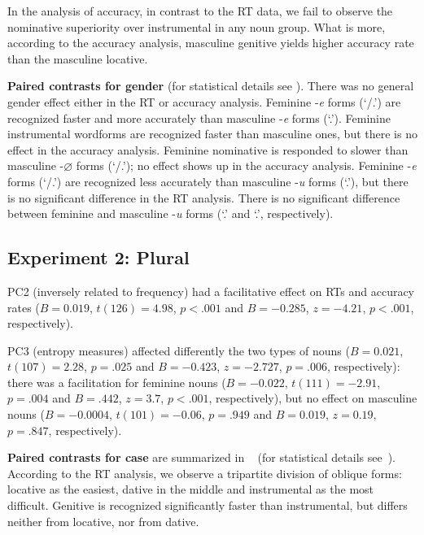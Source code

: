 \documentclass[output=paper, modfonts,newtxmath,hidelinks]{langscibook}
\begin{document}
In the analysis of accuracy, in contrast to the RT data, we fail to observe the nominative superiority over instrumental in any noun group. What is more, according to the accuracy analysis, masculine genitive yields higher accuracy rate than the masculine locative. 

\textbf{Paired contrasts for gender} (for statistical details see ). There was no general gender effect either in the RT or accuracy analysis. Feminine -\textit{e} forms (`\datt/\locc.\fem') are recognized faster and more accurately than masculine -\textit{e} forms (`\locc.\masc'). Feminine instrumental wordforms are recognized faster than masculine ones, but there is no effect in the accuracy analysis. Feminine nominative is responded to slower than masculine -$\varnothing$ forms (`\nomm/\accc.\masc'); no effect shows up in the accuracy analysis. Feminine -\textit{e} forms (`\datt/\locc.\fem') are recognized less accurately than masculine -\textit{u}  forms (`\datt.\masc'), but there is no significant difference in the RT analysis. There is no significant difference between feminine and masculine -\textit{u} forms (`\accc.\fem' and `\datt.\masc', respectively).

\subsection{Experiment 2: Plural}

PC2 (inversely related to frequency) had a facilitative effect on RTs and accuracy rates ($B= 0.019$, $t(126)= 4.98$, $p< .001$ and $B = -0.285$, $z= -4.21$, $p< .001$, respectively). 

PC3 (entropy measures) affected differently the two types of nouns ($B= 0.021$, $t(107)= 2.28$, $p= .025$ and $B = -0.423$, $z= -2.727$, $p= .006$, respectively): there was a facilitation for feminine nouns ($B= -0.022$, $t(111)= -2.91$, $p= .004$ and $B= .442$, $z= 3.7$, $p< .001$, respectively), but no effect on masculine nouns ($B= -0.0004$, $t(101)= -0.06$, $p= .949$ and $B= 0.019$, $z= 0.19$, $p= .847$, respectively).

\textbf{Paired contrasts for case} are summarized in ~ (for statistical details see~). According to the RT analysis, we observe a tripartite division of oblique forms: locative as the easiest, dative in the middle and instrumental as the most difficult. Genitive is recognized significantly faster than instrumental, but differs neither from locative, nor from dative. 
\end{document}
